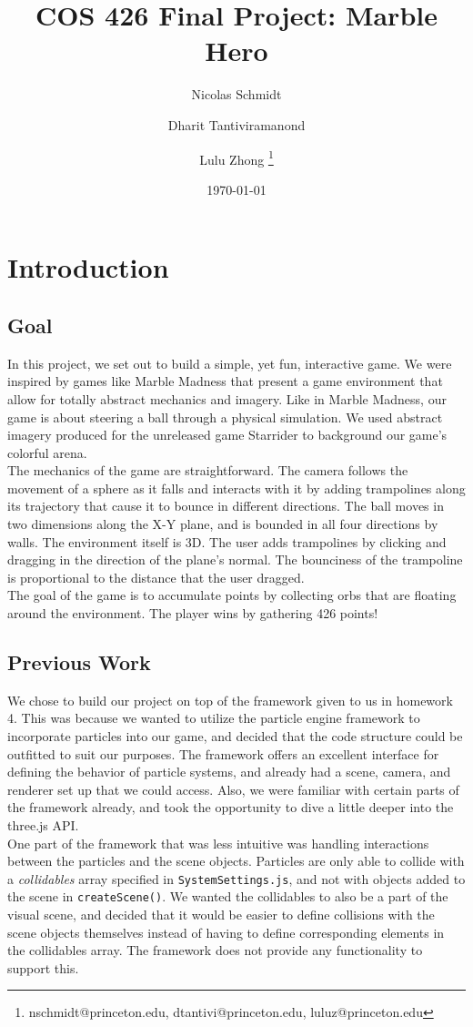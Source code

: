\documentclass[a4paper]{article}
\title{COS 426 Final Project: Marble Hero}
\author{Nicolas Schmidt \and Dharit Tantiviramanond \and Lulu Zhong \thanks{nschmidt@princeton.edu, dtantivi@princeton.edu, luluz@princeton.edu}}
\date{\today}
\begin{document}
\maketitle

\doublespacing

\section{Introduction}
\subsection{Goal}
In this project, we set out to build a simple, yet fun, interactive game. We were inspired by games like Marble Madness that present a game environment that allow for totally abstract mechanics and imagery. Like in Marble Madness, our game is about steering a ball through a physical simulation.  We used abstract imagery produced for the unreleased game Starrider to background our game's colorful arena. \\
The mechanics of the game are straightforward. The camera follows the movement of a sphere as it falls and interacts with it by adding trampolines along its trajectory that cause it to bounce in different directions. The ball moves in two dimensions along the X-Y plane, and is bounded in all four directions by walls. The environment itself is 3D. The user adds trampolines by clicking and dragging in the direction of the plane's normal. The bounciness of the trampoline is proportional to the distance that the user dragged. \\
The goal of the game is to accumulate points by collecting orbs that are floating around the environment. The player wins by gathering 426 points!

\subsection{Previous Work}
We chose to build our project on top of the framework given to us in homework 4. This was because we wanted to utilize the particle engine framework to incorporate particles into our game, and decided that the code structure could be outfitted to suit our purposes. The framework offers an excellent interface for defining the behavior of particle systems, and already had a scene, camera, and renderer set up that we could access. Also, we were familiar with certain parts of the framework already, and took the opportunity to dive a little deeper into the three.js API. \\
One part of the framework that was less intuitive was handling interactions between the particles and the scene objects. Particles are only able to collide with a \textit{collidables} array specified in \texttt{SystemSettings.js}, and not with objects added to the scene in \texttt{createScene()}. We wanted the collidables to also be a part of the visual scene, and decided that it would be easier to define collisions with the scene objects themselves instead of having to define corresponding elements in the collidables array. The framework does not provide any functionality to support this.
\end{document}
